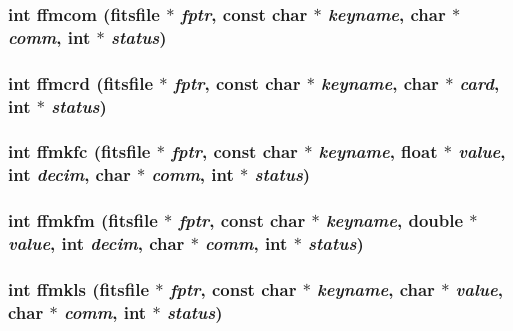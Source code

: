 \subsubsection{\setlength{\rightskip}{0pt plus 5cm}int ffmcom (\bf{fitsfile} $\ast$ {\em fptr}, const char $\ast$ {\em keyname}, char $\ast$ {\em comm}, int $\ast$ {\em status})}\label{fitsio__64_8h_e21b2574f5fb36c2e208473ec81c6f18}


\subsubsection{\setlength{\rightskip}{0pt plus 5cm}int ffmcrd (\bf{fitsfile} $\ast$ {\em fptr}, const char $\ast$ {\em keyname}, char $\ast$ {\em card}, int $\ast$ {\em status})}\label{fitsio__64_8h_0fb8a002759b6bdaa863bb456a57ad93}


\subsubsection{\setlength{\rightskip}{0pt plus 5cm}int ffmkfc (\bf{fitsfile} $\ast$ {\em fptr}, const char $\ast$ {\em keyname}, float $\ast$ {\em value}, int {\em decim}, char $\ast$ {\em comm}, int $\ast$ {\em status})}\label{fitsio__64_8h_633909c19524d20d0f757d3454a079ca}


\subsubsection{\setlength{\rightskip}{0pt plus 5cm}int ffmkfm (\bf{fitsfile} $\ast$ {\em fptr}, const char $\ast$ {\em keyname}, double $\ast$ {\em value}, int {\em decim}, char $\ast$ {\em comm}, int $\ast$ {\em status})}\label{fitsio__64_8h_61e22f498132381f2531f83d38d73928}


\subsubsection{\setlength{\rightskip}{0pt plus 5cm}int ffmkls (\bf{fitsfile} $\ast$ {\em fptr}, const char $\ast$ {\em keyname}, char $\ast$ {\em value}, char $\ast$ {\em comm}, int $\ast$ {\em status})}\label{fitsio__64_8h_0aa39e70d811c97a58750827ab3ad201}


